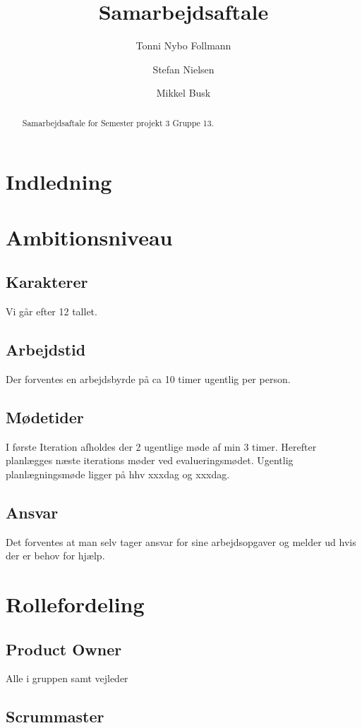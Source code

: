 \documentclass[a4paper,article,11pt,oneside]{memoir}
\title{Samarbejdsaftale}
\author{Tonni Nybo Follmann \and Stefan Nielsen \and Mikkel Busk}
\begin{document}
\maketitle

\begin{abstract}
Samarbejdsaftale for Semester projekt 3 Gruppe 13.
\end{abstract}


\frontmatter
\tableofcontents


\mainmatter
\chapter{Indledning}

\chapter{Ambitionsniveau}

\section{Karakterer}
Vi går efter 12 tallet.
\section{Arbejdstid}
Der forventes en arbejdsbyrde på ca 10 timer ugentlig per person.
\section{Mødetider}
I første Iteration afholdes der 2 ugentlige møde af min 3  timer. Herefter planlægges næste iterations møder ved evalueringsmødet.
Ugentlig planlægningsmøde ligger på hhv xxxdag og xxxdag.

\section{Ansvar}
Det forventes at man selv tager ansvar for sine arbejdsopgaver og melder ud hvis der er behov for hjælp.
\chapter{Rollefordeling}
\section{Product Owner}
Alle i gruppen samt vejleder
\section{Scrummaster}
\end{document}
